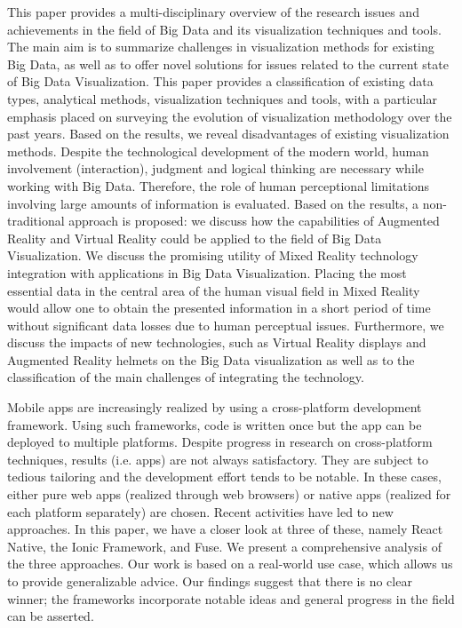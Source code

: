 \documentclass{article}
\begin{document}
\medskip

This paper provides a multi-disciplinary overview of the research issues and achievements in the field of Big Data and its visualization techniques and tools. The main aim is to summarize challenges in visualization methods for existing Big Data, as well as to offer novel solutions for issues related to the current state of Big Data Visualization. This paper provides a classification of existing data types, analytical methods, visualization techniques and tools, with a particular emphasis placed on surveying the evolution of visualization methodology over the past years. Based on the results, we reveal disadvantages of existing visualization methods. Despite the technological development of the modern world, human involvement (interaction), judgment and logical thinking are necessary while working with Big Data. Therefore, the role of human perceptional limitations involving large amounts of information is evaluated. Based on the results, a non-traditional approach is proposed: we discuss how the capabilities of Augmented Reality and Virtual Reality could be applied to the field of Big Data Visualization. We discuss the promising utility of Mixed Reality technology integration with applications in Big Data Visualization. Placing the most essential data in the central area of the human visual field in Mixed Reality would allow one to obtain the presented information in a short period of time without significant data losses due to human perceptual issues. Furthermore, we discuss the impacts of new technologies, such as Virtual Reality displays and Augmented Reality helmets on the Big Data visualization as well as to the classification of the main challenges of integrating the technology.

\medskip

Mobile apps are increasingly realized by using a cross-platform development framework. Using such frameworks, code is written once but the app can be deployed to multiple platforms. Despite progress in research on cross-platform techniques, results (i.e. apps) are not always satisfactory. They are subject to tedious tailoring and the development effort tends to be notable. In these cases, either pure web apps (realized through web browsers) or native apps (realized for each platform separately) are chosen. Recent activities have led to new approaches. In this paper, we have a closer look at three of these, namely React Native, the Ionic Framework, and Fuse. We present a comprehensive analysis of the three approaches. Our work is based on a real-world use case, which allows us to provide generalizable advice. Our findings suggest that there is no clear winner; the frameworks incorporate notable ideas and general progress in the field can be asserted. \cite{majchrzak2017comprehensive}
\end{document}

